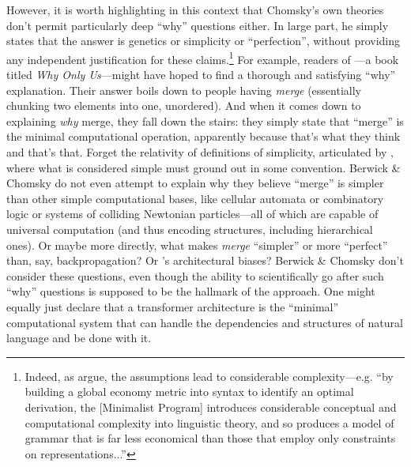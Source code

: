 \documentclass[output=paper,colorlinks,citecolor=brown
]{langscibook}
\begin{document}
However, it is worth highlighting in this context that Chomsky's own theories don't permit particularly deep ``why'' questions either. In large part, he simply states that the answer is genetics or simplicity or ``perfection'', without providing any independent justification for these claims.\footnote{Indeed, as \cite{johnson1997critique} argue, the assumptions lead to considerable complexity---e.g. ``by building a global economy  metric into syntax to identify an optimal derivation, the [Minimalist Program] introduces considerable conceptual and computational complexity into linguistic theory, and so produces a model of grammar that is far less economical than those that employ only constraints on representations...''} For example, readers of \cite{berwick2016only}---a book titled \emph{Why Only Us}---might have hoped to find a thorough and satisfying ``why'' explanation. Their answer boils down to people having \emph{merge} (essentially chunking two elements into one, unordered). And when it comes down to explaining \emph{why} merge, they fall down the stairs: they simply state that ``merge'' is the minimal computational operation, apparently because that's what they think and that's that. Forget the relativity of definitions of simplicity, articulated by \cite{goodman1965new}, where what is considered simple must ground out in some convention. Berwick \& Chomsky do not even attempt to explain why they believe ``merge'' is simpler than other simple computational bases, like cellular automata or combinatory logic or systems of colliding Newtonian particles---all of which are capable of universal computation (and thus encoding structures, including hierarchical ones). Or maybe more directly, what makes \emph{merge} ``simpler'' or more ``perfect'' than, say, backpropagation? Or \cite{elman1996rethinking}'s architectural biases? Berwick \& Chomsky don't consider these questions, even though the ability to scientifically go after such ``why'' questions is supposed to be the hallmark of the approach. One might equally just declare that a transformer architecture is the ``minimal'' computational system that can handle the dependencies and structures of natural language and be done with it.
\end{document}
